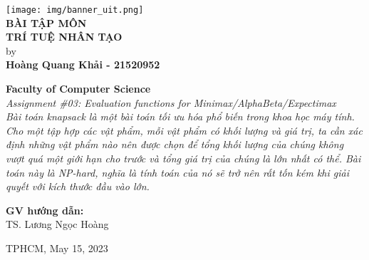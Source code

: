\documentclass[12pt, a4paper]{article}
\begin{document}

\begin{titlepage}

\begin{center}

\texttt{[image: img/banner\_uit.png]}\\%
\vspace{3em}%
\Large \textbf {BÀI TẬP MÔN\\TRÍ TUỆ NHÂN TẠO}\\%
\vspace{1em}%
\normalsize by \\%
\vspace{1em}
\textup{\small\bf Hoàng Quang Khải - 21520952}


 \vspace{1em}%
{\bf Faculty of Computer Science}\\[0.5in]

\emph{Assignment \#03: Evaluation functions for Minimax/AlphaBeta/Expectimax\\Bài toán knapsack là một bài toán tối ưu hóa phổ biến trong khoa học máy tính. Cho một tập hợp các vật phẩm, mỗi vật phẩm có khối lượng và giá trị, ta cần xác định những vật phẩm nào nên được chọn để tổng khối lượng của chúng không vượt quá một giới hạn cho trước và tổng giá trị của chúng là lớn nhất có thể. Bài toán này là NP-hard, nghĩa là tính toán của nó sẽ trở nên rất tốn kém khi giải quyết với kích thước đầu vào lớn.}

\vspace{1in}

    
\normalsize {\bf GV hướng dẫn:} \\

TS. Lương Ngọc Hoàng\\
\vspace{1em}

\vfill


TPHCM, May 15, 2023

\end{center}

\end{titlepage}


\newpage
{} %

\onehalfspacing
\end{document}
